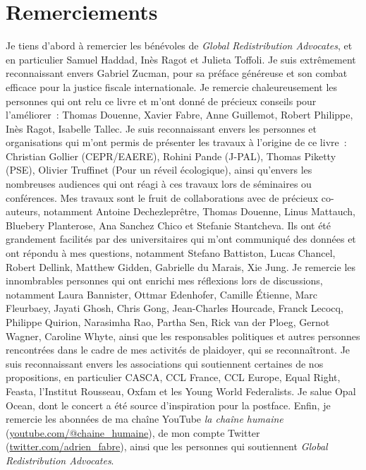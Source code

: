 \documentclass[a5paper,french,openany]{memoir}
\begin{document}
\renewcommand{\url}[1]{\href{#1}{Link}} %
{\small 

}

\clearpage
\section*{Remerciements}\label{sec:merci} 
Je tiens d'abord à remercier les bénévoles de \textit{Global Redistribution Advocates}, et en particulier Samuel Haddad, Inès Ragot et Julieta Toffoli. Je suis extrêmement reconnaissant envers Gabriel Zucman, pour sa préface généreuse et son combat efficace pour la justice fiscale internationale. Je remercie chaleureusement les personnes qui ont relu ce livre et m'ont donné de précieux conseils pour l'améliorer~: Thomas Douenne, Xavier Fabre, Anne Guillemot, Robert Philippe, Inès Ragot, Isabelle Tallec. Je suis reconnaissant envers les personnes et organisations qui m'ont permis de présenter les travaux à l'origine de ce livre~: Christian Gollier (CEPR/EAERE), Rohini Pande (J-PAL), Thomas Piketty (PSE), Olivier Truffinet (Pour un réveil écologique), ainsi qu'envers les nombreuses audiences qui ont réagi à ces travaux lors de séminaires ou conférences. Mes travaux sont le fruit de collaborations avec de précieux co-auteurs, notamment Antoine Dechezleprêtre, Thomas Douenne, Linus Mattauch, Bluebery Planterose, Ana Sanchez Chico et Stefanie Stantcheva. 
Ils ont été grandement facilités par des universitaires qui m'ont communiqué des données et ont répondu à mes questions, notamment Stefano Battiston, Lucas Chancel, Robert Dellink, Matthew Gidden, Gabrielle du Marais, Xie Jung. %
Je remercie les innombrables personnes qui ont enrichi mes réflexions lors de discussions, notamment Laura Bannister, Ottmar Edenhofer, Camille Étienne, Marc Fleurbaey, Jayati Ghosh, Chris Gong, Jean-Charles Hourcade, Franck Lecocq, Philippe Quirion, Narasimha Rao, Partha Sen, Rick van der Ploeg, Gernot Wagner, Caroline Whyte, ainsi que les responsables politiques et autres personnes rencontrées dans le cadre de mes activités de plaidoyer, qui se reconnaîtront. Je suis reconnaissant envers les associations qui soutiennent certaines de nos propositions, 
en particulier CASCA, CCL France, CCL Europe, Equal Right, Feasta, l'Institut Rousseau, Oxfam et les Young World Federalists. Je salue Opal Ocean, dont le concert a été source d'inspiration pour la postface. Enfin, je remercie les abonné\textperiodcentered{}e\textperiodcentered{}s de ma chaîne YouTube \textit{la chaîne humaine} (\href{https://www.youtube.com/@chaine_humaine}{youtube.com/@chaine\_humaine}), de mon compte Twitter (\href{https://twitter.com/adrien_fabre}{twitter.com/adrien\_fabre}), ainsi que les personnes qui soutiennent \textit{Global Redistribution Advocates}.

\pagebreak \vspace*{-2cm}
\listoftables \vspace{-1cm}
\listoffigures
\end{document}
